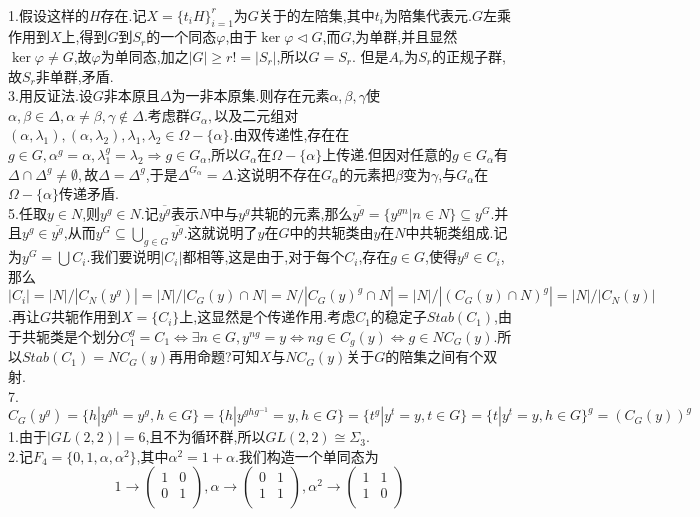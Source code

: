 \documentclass[b5paper]{ctexart}
\begin{document}
\pagestyle{plain}
\noindent
\\
1.假设这样的$H$存在.记$X=\{t_iH\}_{i=1}^r$为$G$关于的左陪集,其中$t_i$为陪集代表元.$G$左乘作用到$X$上,得到$G$到$S_r$的一个同态$\varphi$,由于$\ker\varphi\triangleleft G$,而$G$,为单群,并且显然$\ker\varphi\neq G$,故$\varphi$为单同态,加之$|G|\geq r!=|S_r|$,所以$G=S_r$.
但是$A_r$为$S_r$的正规子群,故$S_r$非单群,矛盾.\\
3.用反证法.设$G$非本原且$\Delta$为一非本原集.则存在元素$\alpha,\beta,\gamma$使$\alpha,\beta\in \Delta,\alpha\neq\beta,\gamma\notin \Delta$.考虑群$G_{\alpha},$以及二元组对$(\alpha,\lambda_1),(\alpha,\lambda_2),\lambda_1,\lambda_2\in \Omega-\{\alpha\}$.由双传递性,存在在$g\in G,\alpha^g=\alpha,\lambda_1^g=\lambda_2\Rightarrow g\in G_{\alpha}$,所以$G_{\alpha}$在$\Omega-\{\alpha\}$上传递.但因对任意的$g\in G_{\alpha}$有$\Delta\cap\Delta^g\neq\emptyset,$故$\Delta=\Delta^g$,于是$\Delta^{G_{\alpha}}=\Delta.$这说明不存在$G_{\alpha}$的元素把$\beta$变为$\gamma$,与$G_{\alpha}$在$\Omega-\{\alpha\}$传递矛盾.\\
5.任取$y\in N$,则$y^g\in N$.记$\overline{y^g}$表示$N$中与$y^g$共轭的元素,那么$\overline{y^g}=\{y^{gn}|n\in N\}\subseteq
 y^G$.并且$y^g\in \overline{y^g}$,从而$y^G\subseteq \bigcup_{g\in G}\overline{y^g}$.这就说明了$y$在$G$中的共轭类由$y$在$N$中共轭类组成.记为$y^G=\bigcup C_i$.我们要说明$|C_i|$都相等,这是由于,对于每个$C_i$,存在$g\in G$,使得$y^g\in C_i$,那么$|C_i|=|N|/|C_N(y^g)|=|N|/|C_G(y)\cap N|=N/|C_G(y)^g\cap N|=|N|/|(C_G(y)\cap N)^g|=|N|/|C_N(y)|$.再让$G$共轭作用到$X=\{C_i\}$上,这显然是个传递作用.考虑$C_1$的稳定子$Stab(C_1)$,由于共轭类是个划分$C_1^g=C_1\Leftrightarrow \exists n\in G,y^{ng}=y\Leftrightarrow ng\in C_g(y)\Leftrightarrow g\in NC_G(y)
$.所以$Stab(C_1)=NC_G(y)$再用命题?可知$X$与$NC_G(y)$关于$G$的陪集之间有个双射.\\
7.$C_G(y^g)=\{h|y^{gh}=y^g,h\in G\}=\{h|y^{ghg^{-1}}=y,h\in G\}=\{t^g|y^t=y,t\in G\}=\{t|y^t=y,h\in G\}^g=(C_G(y))^g$\\
1.由于$|GL(2,2)|=6$,且不为循环群,所以$GL(2,2)\cong\Sigma_3.$\\
2.记$F_4=\{0,1,\alpha,\alpha^2\}$,其中$\alpha^2=1+\alpha$.我们构造一个单同态为
\[1\to \left( \begin{array}{cc}
1 & 0\\
0 & 1\\
\end{array}\right) ,\alpha\to \left( \begin{array}{cc}
0 & 1\\
1 & 1\\
\end{array}\right) ,\alpha^2\to \left( \begin{array}{cc}
1 & 1\\
1 & 0\\
\end{array}\right)\]
\end{document}

